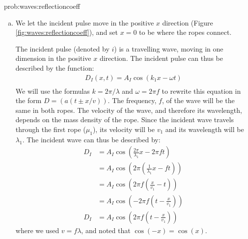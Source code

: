 \begin{solution}{prob:waves:reflectioncoeff}\label{soln:waves:reflectioncoeff}
\begin{enumerate}[(a)] 
\item We let the incident pulse move in the positive $x$ direction (Figure \ref{fig:waves:reflectioncoeff}), and set $x=0$ to be where the ropes connect.

The incident pulse (denoted by $i$) is a travelling wave, moving in one dimension in the positive $x$ direction. The incident pulse can thus be described by the function:
\begin{align*}
D_I(x,t)=A_I\cos(k_1x-\omega t)\\
\end{align*}
We will use the formulas $k=2\pi/\lambda$ and $\omega=2\pi f$ to rewrite this equation in the form $D=(a(t\pm x/v))$. The frequency, $f$, of the wave will be the same in both ropes. The velocity of the wave, and therefore its wavelength, depends on the mass density of the rope. Since the incident wave travels through the first rope ($\mu_1$), its velocity will be $v_1$ and its wavelength will be $\lambda_1$. The incident wave can thus be described by:
\begin{align*}
D_I&=A_I\cos\left( \frac{2\pi}{\lambda_1}x-2\pi ft\right)\\
&=A_I\cos \left( 2\pi\left(\frac{1}{\lambda_1}x- ft\right)\right)\\
&=A_I\cos \left( 2\pi f\left(\frac{x}{v_1}- t\right)\right)\\
&=A_I\cos \left( -2\pi f\left(t-\frac{x}{v_1}\right)\right)\\
D_I&=A_I\cos \left(2\pi f\left(t-\frac{x}{v_1}\right)\right)
\end{align*}
where we used $v=f\lambda$, and noted that $\cos(-x)=\cos(x)$.\\


\end{enumerate}
\end{solution}
